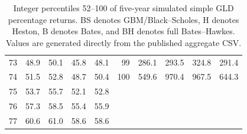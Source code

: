 \documentclass[a4paper,10pt,titlepage,oneside,openany]{book}
\theoremstyle{plain}
\theoremstyle{definition}
\theoremstyle{remark}
\begin{document}
\begin{table}[p]
\begin{tabular}{@{}rrrrr@{\hspace{8mm}}rrrrr@{}}
73 & 48.9 & 50.1 & 45.8 & 48.1 & 99 & 286.1 & 293.5 & 324.8 & 291.4 \\
74 & 51.5 & 52.8 & 48.7 & 50.4 & 100 & 549.6 & 970.4 & 967.5 & 644.3 \\
75 & 53.7 & 55.7 & 52.1 & 52.8 &  &  &  &  &  \\
76 & 57.3 & 58.5 & 55.4 & 55.9 &  &  &  &  &  \\
77 & 60.6 & 61.0 & 58.6 & 58.6 &  &  &  &  &  \\
\bottomrule
\end{tabular}
\caption{Integer percentiles 52--100 of five-year simulated simple GLD percentage returns. BS denotes GBM/Black--Scholes, H denotes Heston, B denotes Bates, and BH denotes full Bates--Hawkes. Values are generated directly from the published aggregate CSV.}
\label{tab:appendix-percentiles-52-100}
\end{table}
\end{document}
